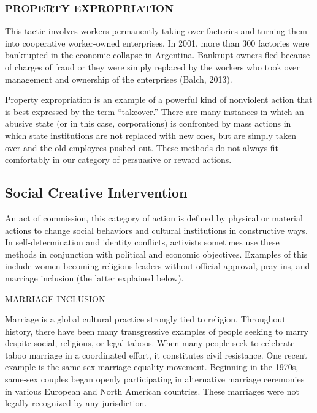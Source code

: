 \documentclass[twoside,a4paper,12pt,fleqn,openany]{extbook}
\begin{document}
\subsubsection*{PROPERTY EXPROPRIATION}

This tactic involves workers permanently taking over factories and turning them into cooperative worker-owned enterprises. In 2001, more than 300 factories were bankrupted in the economic collapse in Argentina. Bankrupt owners fled because of charges of fraud or they were simply replaced by the workers who took over management and ownership of the enterprises (Balch, 2013).

Property expropriation is an example of a powerful kind of nonviolent action that is best expressed by the term “takeover.” There are many instances in which an abusive state (or in this case, corporations) is confronted by mass actions in which state institutions are not replaced with new ones, but are simply taken over and the old employees pushed out. These methods do not always fit comfortably in our category of persuasive or reward actions.

\subsection*{Social Creative Intervention}

An act of commission, this category of action is defined by physical or material actions to change social behaviors and cultural institutions in constructive ways. In self-determination and identity conflicts, activists sometimes use these methods in conjunction with political and economic objectives. Examples of this include women becoming religious leaders without official approval, pray-ins, and marriage inclusion (the latter explained below).

MARRIAGE INCLUSION

Marriage is a global cultural practice strongly tied to religion. Throughout history, there have been many transgressive examples of people seeking to marry despite social, religious, or legal taboos. When many people seek to celebrate taboo marriage in a coordinated effort, it constitutes civil resistance. One recent example is the same-sex marriage equality movement. Beginning in the 1970s, same-sex couples began openly participating in alternative marriage ceremonies in various European and North American countries. These marriages were not legally recognized by any jurisdiction.
\end{document}
